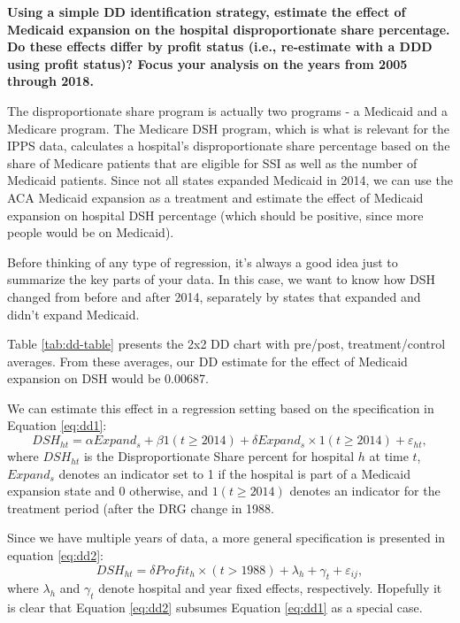 \documentclass[
  12pt,
]{article}
\begin{document}
\textbf{Using a simple DD identification strategy, estimate the effect of Medicaid expansion on the hospital disproportionate share percentage. Do these effects differ by profit status (i.e., re-estimate with a DDD using profit status)? Focus your analysis on the years from 2005 through 2018.}

The disproportionate share program is actually two programs - a Medicaid and a Medicare program. The Medicare DSH program, which is what is relevant for the IPPS data, calculates a hospital's disproportionate share percentage based on the share of Medicare patients that are eligible for SSI as well as the number of Medicaid patients. Since not all states expanded Medicaid in 2014, we can use the ACA Medicaid expansion as a treatment and estimate the effect of Medicaid expansion on hospital DSH percentage (which should be positive, since more people would be on Medicaid).

Before thinking of any type of regression, it's always a good idea just to summarize the key parts of your data. In this case, we want to know how DSH changed from before and after 2014, separately by states that expanded and didn't expand Medicaid.

Table \ref{tab:dd-table} presents the 2x2 DD chart with pre/post, treatment/control averages. From these averages, our DD estimate for the effect of Medicaid expansion on DSH would be 0.00687.

We can estimate this effect in a regression setting based on the specification in Equation \eqref{eq:dd1}:
\begin{equation}
DSH_{ht} = \alpha Expand_{s} + \beta 1(t\geq 2014) + \delta Expand_{s} \times 1(t\geq 2014) + \varepsilon_{ht}, \label{eq:dd1}
\end{equation}
where \(DSH_{ht}\) is the Disproportionate Share percent for hospital \(h\) at time \(t\), \(Expand_{s}\) denotes an indicator set to 1 if the hospital is part of a Medicaid expansion state and 0 otherwise, and \(1(t\geq 2014)\) denotes an indicator for the treatment period (after the DRG change in 1988.

Since we have multiple years of data, a more general specification is presented in equation \eqref{eq:dd2}:
\begin{equation}
DSH_{ht} = \delta Profit_{h} \times (t>1988) + \lambda_{h} + \gamma_{t} + \varepsilon_{ij}, \label{eq:dd2}
\end{equation}
where \(\lambda_{h}\) and \(\gamma_{t}\) denote hospital and year fixed effects, respectively. Hopefully it is clear that Equation \eqref{eq:dd2} subsumes Equation \eqref{eq:dd1} as a special case.
\end{document}
